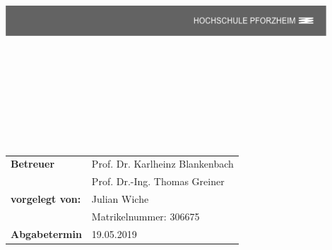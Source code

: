 \documentclass[a4paper,headsepline,bibliography=totoc,listof=totoc]{scrartcl}							%
\begin{document}
\pagestyle{headings}

\begin{titlepage}
\begin{center}

\includegraphics[width=0.9\textwidth]{./img/logo} \\[0.8 cm]

\\[0.3 cm]

\\[0.3 cm]

\text{ }

\\[1.5 cm]

\\[1 cm]

\\[0.5 cm]

\\
\\[1 cm]

\begin{tabular}[h]{ll}

 \textbf{Betreuer} &Prof. Dr. Karlheinz Blankenbach \\&Prof. Dr.-Ing. Thomas Greiner\\[0.3 cm] 


 \textbf{vorgelegt von:} &  Julian Wiche\\ 
 & Matrikelnummer: 306675\\[0.3 cm] 

 \textbf{Abgabetermin} & 19.05.2019 \\[0.3 cm] 

 

\end{tabular} 

\end{center}
\end{titlepage}


\tableofcontents
\setcounter{page}{1}
\newpage

\end{document}

